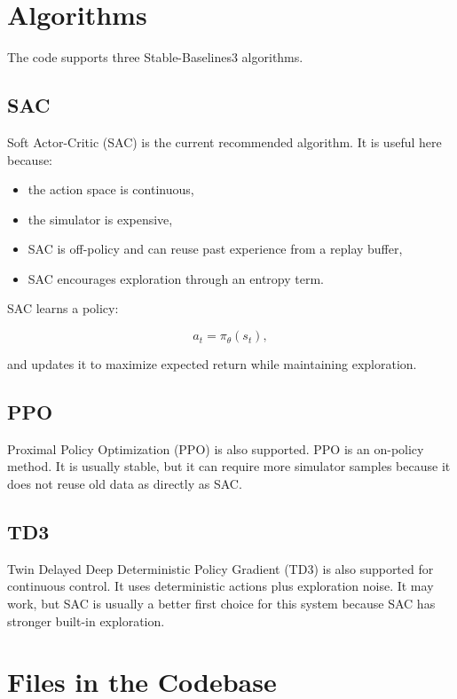 \documentclass[11pt]{article}
\begin{document}
\section{Algorithms}

The code supports three Stable-Baselines3 algorithms.

\subsection{SAC}

Soft Actor-Critic (SAC) is the current recommended algorithm. It is useful here
because:

\begin{itemize}[nosep]
    \item the action space is continuous,
    \item the simulator is expensive,
    \item SAC is off-policy and can reuse past experience from a replay buffer,
    \item SAC encourages exploration through an entropy term.
\end{itemize}

SAC learns a policy:

\[
a_t = \pi_\theta(s_t),
\]

and updates it to maximize expected return while maintaining exploration.

\subsection{PPO}

Proximal Policy Optimization (PPO) is also supported. PPO is an on-policy
method. It is usually stable, but it can require more simulator samples because
it does not reuse old data as directly as SAC.

\subsection{TD3}

Twin Delayed Deep Deterministic Policy Gradient (TD3) is also supported for
continuous control. It uses deterministic actions plus exploration noise. It may
work, but SAC is usually a better first choice for this system because SAC has
stronger built-in exploration.

\section{Files in the Codebase}
\end{document}
